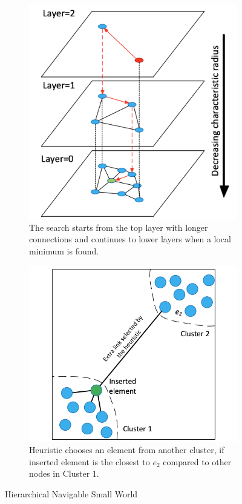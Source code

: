 \begin{figure}
    \centering
    \begin{subfigure}[b]{0.4\textwidth}
        \includegraphics[width=\textwidth]{thesis/images/hnsw-fig.png}
        \caption{The search starts from the top layer with longer connections and continues to lower layers when a local minimum is found.}
        \label{fig:hnsw1}
    \end{subfigure}
    \begin{subfigure}[b]{0.45\textwidth}
        \includegraphics[width=\textwidth]{thesis/images/hnsw-fig2.png}
        \caption{Heuristic chooses an element from another cluster, if inserted element is the closest to $e_2$ compared to other nodes in Cluster 1.}
        \label{fig:hnsw2}
    \end{subfigure}
    \caption{Hierarchical Navigable Small World~\cite{malkov2018efficient}}
    \label{fig:hnsw}
\end{figure}

